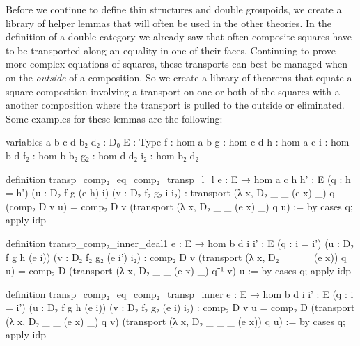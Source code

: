 Before we continue to define thin structures and double groupoids,
we create a library of helper lemmas that will often be used in the other theories.
In the definition of a double category we already saw that often composite
squares have to be transported along an equality in one of their faces.
Continuing to prove more complex equations of squares, these transports can
best be managed when on the \emph{outside} of a composition.
So we create a library of theorems that equate a square composition involving
a transport on one or both of the squares with a another composition where the
transport is pulled to the outside or eliminated.
Some examples for these lemmas are the following:
\begin{leancodebr}
variables {a b c d b₂ d₂ : D₀} {E : Type}
  {f : hom a b} {g : hom c d} {h : hom a c} {i : hom b d}
  {f₂ : hom b b₂} {g₂ : hom d d₂} {i₂ : hom b₂ d₂}

definition transp_comp₂_eq_comp₂_transp_l_l {e : E → hom a c}
  {h h' : E} (q : h = h')
  (u : D₂ f g (e h) i) (v : D₂ f₂ g₂ i i₂) :
  transport (λ x, D₂ _ _ (e x) _) q (comp₂ D v u)
  = comp₂ D v (transport (λ x, D₂ _ _ (e x) _) q u) :=
by cases q; apply idp

definition transp_comp₂_inner_deal1 {e : E → hom b d}
  {i i' : E} (q : i = i')
  (u : D₂ f g h (e i)) (v : D₂ f₂ g₂ (e i') i₂) :
  comp₂ D v (transport (λ x, D₂ _ _ _ (e x)) q u)
  = comp₂ D (transport (λ x, D₂ _ _ (e x) _) q⁻¹ v) u :=
by cases q; apply idp

definition transp_comp₂_eq_comp₂_transp_inner {e : E → hom b d}
  {i i' : E} (q : i = i')
  (u : D₂ f g h (e i)) (v : D₂ f₂ g₂ (e i) i₂) :
  comp₂ D v u = comp₂ D (transport (λ x, D₂ _ _ (e x) _) q v)
    (transport (λ x, D₂ _ _ _ (e x)) q u) :=
by cases q; apply idp
\end{leancodebr}

